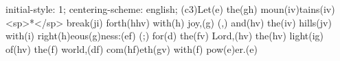 initial-style: 1;
centering-scheme: english;
(c3)Let(e) the(gh) moun(iv)tains(iv) <sp>*</sp> break(ji) forth(hhv) with(h) joy,(g) (,) and(hv) the(iv) hills(jv) with(i) right(h)eous(g)ness:(ef) (;) for(d) the(fv) Lord,(hv) the(hv) light(ig) of(hv) the(f) world,(df) com(hf)eth(gv) with(f) pow(e)er.(e)
